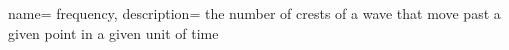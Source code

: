  {
    name= frequency,
    description= {the number of crests of a wave that move past a given point in a given unit of time}
}
